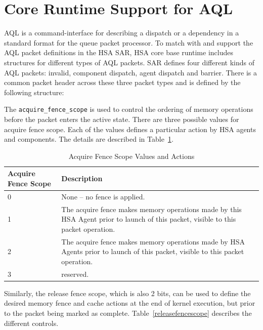\hypertarget{coreapi_AQL}{}\section{Core Runtime Support for
AQL}\label{AQL}
AQL is a command-interface for describing a dispatch or a dependency
in a standard format for the queue packet processor. 
To match with and support the AQL packet definitions in the HSA SAR,
HSA core base runtime includes structures for different types of AQL
packets.  SAR defines four different kinds of AQL packets: invalid,
component dispatch, agent dispatch and barrier.  There is a common
packet header across these three packet types and is defined by the
following structure:



The \texttt{acquire\_fence\_scope} is used to control the ordering
of memory operations before the packet enters the active state.
There are three possible values for acquire fence scope. Each of the
values defines a particular action by HSA agents and components. The
details are described in Table~\ref{acquirefencescope}.

\begin{table}
  \begin{center}
    \begin{tabular}{|p{1in}|p{5in}|}
      \hline
      \textbf{Acquire Fence Scope} &\textbf{Description} \\ 
      \hline
      0	& None -- no fence is applied. \\
      \hline
      1	& The acquire fence makes memory operations made by this HSA
      Agent prior to launch of this packet, visible to this packet
      operation. \\
      \hline
      2	& The acquire fence makes memory operations made by HSA
      Agents prior to launch of this packet, visible to this packet
      operation.\\
      \hline
      3	& reserved. \\
      \hline
    \end{tabular}
  \end{center}
  \caption{Acquire Fence Scope Values and Actions}
  \label{acquirefencescope}
\end{table}

Similarly, the release fence scope, which is also 2 bits, can be
used to define the desired memory fence and cache actions at the
end of kernel execution, but prior to the packet being marked as
complete. Table~\ref{releasefencescope} describes the different
controls.

